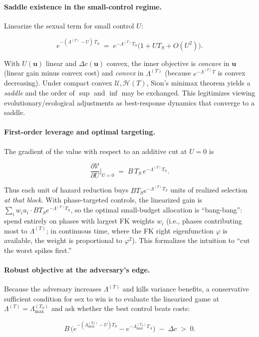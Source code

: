 \documentclass[11pt]{article}
\theoremstyle{upright}
\newcommand{\hazT}[1]{\Lambda^{(#1)}}          %
\begin{document}
\paragraph{Saddle existence in the small-control regime.}
Linearize the sexual term for small control $U$:

$$
e^{-(\hazT{T}-U)\,T_S}\;=\;e^{-\hazT{T}T_S}\big(1+U T_S + O(U^2)\big).
$$

With $U(\mathbf u)$ linear and $\Delta c(\mathbf u)$ convex, the inner objective is \emph{concave} in $\mathbf u$ (linear gain minus convex cost) and \emph{convex} in $\hazT{T}$ (because $e^{-\hazT{T} T}$ is convex decreasing). Under compact convex $\mathcal U,\mathcal H(T)$, Sion’s minimax theorem yields a \emph{saddle} and the order of $\sup$ and $\inf$ may be exchanged. This legitimizes viewing evolutionary/ecological adjustments as best-response dynamics that converge to a saddle.

\paragraph{First-order leverage and optimal targeting.}
The gradient of the value with respect to an additive cut at $U=0$ is

$$
\frac{\partial \mathcal V}{\partial U}\Big|_{U=0}
\;=\; B\,T_S\,e^{-\hazT{T}T_S}.
$$

Thus each unit of hazard reduction buys $B T_S e^{-\hazT{T}T_S}$ units of realized selection \emph{at that block}. With phase-targeted controls, the linearized gain is $\sum_i w_i u_i\cdot B T_S e^{-\hazT{T}T_S}$, so the optimal small-budget allocation is “bang-bang”: spend entirely on phases with largest FK weights $w_i$ (i.e., phases contributing most to $\hazT{T}$; in continuous time, where the FK right eigenfunction $\varphi$ is available, the weight is proportional to $\varphi^2$). This formalizes the intuition to “cut the worst spikes first.”

\paragraph{Robust objective at the adversary’s edge.}
Because the adversary increases $\hazT{T}$ and kills variance benefits, a conservative sufficient condition for sex to win is to evaluate the linearized game at $\hazT{T}=\Lambda_{\max}^{(T_S)}$ and ask whether the best control beats costs:

$$
B\,\big(e^{-(\Lambda_{\max}^{(T_S)}-U)T_S}-e^{-\Lambda_{\max}^{(T_S)}T_A}\big)\;-\;\Delta c \;>\;0.
$$
\end{document}

